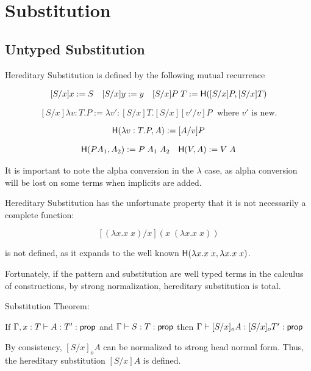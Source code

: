 \section{Substitution}

\subsection{Untyped Substitution}

\begin{definition}
Hereditary Substitution is defined by the following mutual recurrence

\[ \begin{array}[3]{llr}
[ S / x ] x := S
&
[S / x] y := y
&
[S / x] P\;T := \m{H}([S/x] P, [S/x]T)
\end{array} \]

\[
[S / x] \lambda v : T . P := \lambda v' : [S/x]T . [S/x][v'/v]P
\;
\text{  where $v'$ is new.}
\]

\[ 
\mathsf{H}(\lambda v : T . P , A) := [A/v] P
\]

\[ \begin{array}[2]{lr}
\m{H}(P A_1 , A_2) := P\;A_1\;A_2
&
\m{H}(V , A) := V\; A
\end{array} \]

\label{def:hered}
\end{definition}

It is important to note the alpha conversion in the $\lambda$ case, as alpha conversion will be lost on 
some terms when implicits are added.

Hereditary Substitution has the unfortunate property that it is not necessarily a complete function:

\[
[(\lambda x . x\; x) / x ] ( x \; (\lambda x . x\; x) )
\]

is not defined, as it expands to the well known $\mathsf{H}(\lambda x . x \; x , \lambda x . x \; x)$.

Fortunately, if the pattern and substitution are well typed terms in the calculus of constructions, by 
strong normalization, hereditary substitution is total.

\begin{theorem} Substitution Theorem:

If $\Gamma,x : T \vdash A : T' : \mathsf{prop}$  and $\Gamma \vdash S : T : \mathsf{prop}$ then
$ \Gamma \vdash [S/x]_o A : [S/x]_o T' : \mathsf{prop}$
\end{theorem}

By consistency, $[S/x]_o A $ can be normalized to strong head normal form.  Thus, the 
hereditary substitution $[S/x] A$ is defined.



